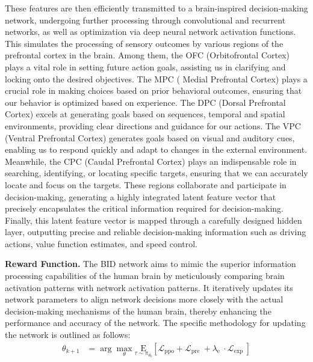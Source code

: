 These features are then efficiently transmitted to a brain-inspired decision-making network, undergoing further processing through convolutional and recurrent networks, as well as optimization via deep neural network activation functions. This simulates the processing of sensory outcomes by various regions of the prefrontal cortex in the brain. Among them, the OFC (Orbitofrontal Cortex) plays a vital role in setting future action goals, assisting us in clarifying and locking onto the desired objectives. The MPC ( Medial Prefrontal Cortex) plays a crucial role in making choices based on prior behavioral outcomes, ensuring that our behavior is optimized based on experience. The DPC (Dorsal Prefrontal Cortex) excels at generating goals based on sequences, temporal and spatial environments, providing clear directions and guidance for our actions. The VPC (Ventral Prefrontal Cortex) generates goals based on visual and auditory cues, enabling us to respond quickly and adapt to changes in the external environment.  Meanwhile, the CPC (Caudal Prefrontal Cortex) plays an indispensable role in searching, identifying, or locating specific targets, ensuring that we can accurately locate and focus on the targets.  These regions collaborate and participate in decision-making, generating a highly integrated latent feature vector that precisely encapsulates the critical information required for decision-making. Finally, this latent feature vector is mapped through a carefully designed hidden layer, outputting precise and reliable decision-making information such as driving actions, value function estimates, and speed control.

\textbf{\textsf{Reward Function.}} The BID network aims to mimic the superior information processing capabilities of the human brain by meticulously comparing brain activation patterns with network activation patterns. It iteratively updates its network parameters to align network decisions more closely with the actual decision-making mechanisms of the human brain, thereby enhancing the performance and accuracy of the network. The specific methodology for updating the network is outlined as follows:
\begin{align}
	\theta_{k+1} & = \arg \max _{\theta} \underset{\tau \sim \pi_{\theta_{k}}}{\mathrm{E}}\left[\mathcal{L}_{\mathrm{ppo}}+\mathcal{L}_{\text {pre }}+\lambda_{\text {e }} \cdot \mathcal{L}_{\text {exp }}\right]
\end{align}

